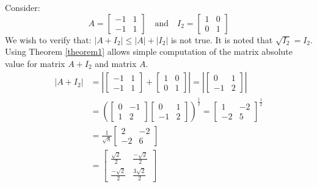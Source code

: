 \begin{example}
Consider: 
$$
A = \begin{bmatrix}
    -1 & 1 \\
    -1 & 1
\end{bmatrix} \quad
\text{and} \quad
I_2 = \begin{bmatrix}
    1 & 0 \\
    0 & 1
\end{bmatrix}
$$
We wish to verify that: $|A+I_2| \leq |A|+|I_2|$ is not true. It is noted that $\sqrt{I_2}=I_2$. Using Theorem \ref{theorem1} allows simple computation of the matrix absolute value for matrix $A+I_2$ and matrix $A$.
\begin{align*}
    |A+I_2| &= 
    \left|\begin{bmatrix}
        -1 & 1 \\
        -1 & 1
    \end{bmatrix} 
    +
    \begin{bmatrix}
        1 & 0 \\
        0 & 1
    \end{bmatrix}\right| 
    = 
    \left|\begin{bmatrix}
        0 & 1 \\
        -1 & 2
    \end{bmatrix}\right| \\
    &=
    \left(
    \begin{bmatrix}
        0 & -1 \\
        1 & 2
    \end{bmatrix}
    \begin{bmatrix}
       0 & 1 \\
        -1 & 2 
    \end{bmatrix}\right)^\frac{1}{2} 
    =
    \begin{bmatrix}
        1 & -2 \\
        -2 & 5
    \end{bmatrix}^\frac{1}{2}\\
    &= 
    \frac{1}{\sqrt{8}}
    \begin{bmatrix}
        2 & -2\\
        -2 & 6
    \end{bmatrix}\\
    &=
    \begin{bmatrix}
         \frac{\sqrt{2}}{2} & \frac{-\sqrt{2}}{2} \\
        \frac{-\sqrt{2}}{2} & \frac{3\sqrt{2}}{2}
    \end{bmatrix}
\end{align*}

\end{example}
